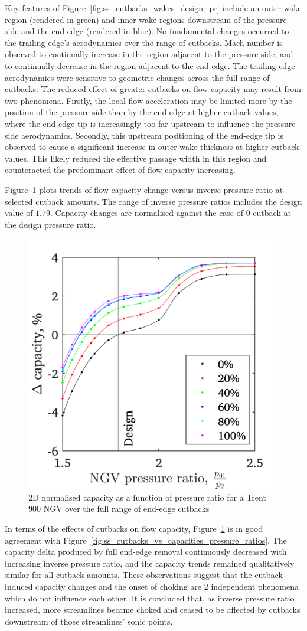 \documentclass[a4paper, 11pt, oneside]{report}
\begin{document}
Key features of Figure~\ref{fig:ss_cutbacks_wakes_design_pr} include an outer wake region (rendered in green) and inner wake regions downstream of the pressure side and the end-edge (rendered in blue). No fundamental changes occurred to the trailing edge's aerodynamics over the range of cutbacks. Mach number is observed to continually increase in the region adjacent to the pressure side, and to continually decrease in the region adjacent to the end-edge. The trailing edge aerodynamics were sensitive to geometric changes across the full range of cutbacks. The reduced effect of greater cutbacks on flow capacity may result from two phenomena. Firstly, the local flow acceleration may be limited more by the position of the pressure side than by the end-edge at higher cutback values, where the end-edge tip is increasingly too far upstream to influence the pressure-side aerodynamics. Secondly, this upstream positioning of the end-edge tip is observed to cause a significant increase in outer wake thickness at higher cutback values. This likely reduced the effective passage width in this region and counteracted the predominant effect of flow capacity increasing.

Figure~\ref{fig:ss_cutbacks_vs_capacities_trends} plots trends of flow capacity change versus inverse pressure ratio at selected cutback amounts. The range of inverse pressure ratios includes the design value of $1.79$. Capacity changes are normalised against the case of $0$ cutback at the design pressure ratio.

\begin{figure}[H]
	\centering
	\includegraphics[width=.45\textwidth]{figs/ss_cutbacks_vs_capacities_trends.png}
	\caption{2D normalised capacity as a function of pressure ratio for a Trent 900 NGV over the full range of end-edge cutbacks}
    \label{fig:ss_cutbacks_vs_capacities_trends}
\end{figure}

In terms of the effects of cutbacks on flow capacity, Figure~\ref{fig:ss_cutbacks_vs_capacities_trends} is in good agreement with Figure~\ref{fig:ss_cutbacks_vs_capacities_pressure_ratios}. The capacity delta produced by full end-edge removal continuously decreased with increasing inverse pressure ratio, and the capacity trends remained qualitatively similar for all cutback amounts. These observations suggest that the cutback-induced capacity changes and the onset of choking are 2 independent phenomena which do not influence each other. It is concluded that, as inverse pressure ratio increased, more streamlines became choked and ceased to be affected by cutbacks downstream of those streamlines' sonic points. 
\end{document}
